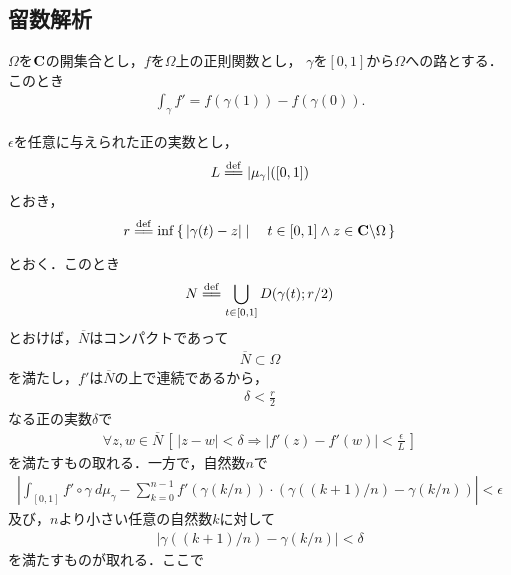 \subsection{留数解析}
	
	\begin{screen}
		\begin{thm}[線積分の微分積分学の基本定理]
			$\Omega$を$\mathbf{C}$の開集合とし，$f$を$\Omega$上の正則関数とし，
			$\gamma$を$[0,1]$から$\Omega$への路とする．このとき
			\begin{align}
				\int_{\gamma} f' = f(\gamma(1)) - f(\gamma(0)).
			\end{align}
		\end{thm}
	\end{screen}
	
	\begin{sketch}
		$\epsilon$を任意に与えられた正の実数とし，
		\begin{align}
			L \defeq |\mu_{\gamma}|([0,1])
		\end{align}
		とおき，
		\begin{align}
			r \defeq \inf{}{\Set{|\gamma(t) - z|}{t \in [0,1] \wedge z \in \C \backslash \Omega}}
		\end{align}
		とおく．このとき
		\begin{align}
			N \defeq \bigcup_{t \in [0,1]} \disc{\gamma(t)}{r/2}
		\end{align}
		とおけば，$\overline{N}$はコンパクトであって
		\begin{align}
			\overline{N} \subset \Omega
		\end{align}
		を満たし，$f'$は$\overline{N}$の上で連続であるから，
		\begin{align}
			\delta < \frac{r}{2}
		\end{align}
		なる正の実数$\delta$で
		\begin{align}
			\forall z,w \in \overline{N}\,
			\left[\, |z-w| < \delta \Longrightarrow |f'(z) - f'(w)| < \frac{\epsilon}{L}\, \right]
		\end{align}
		を満たすもの取れる．一方で，自然数$n$で
		\begin{align}
			\left|\int_{[0,1]} f' \circ \gamma\ d\mu_{\gamma}
			- \sum_{k=0}^{n-1} f'(\gamma(k/n)) \cdot \left(\gamma((k+1)/n) - \gamma(k/n)\right)\right|
			< \epsilon
		\end{align}
		及び，$n$より小さい任意の自然数$k$に対して
		\begin{align}
			|\gamma((k+1)/n) - \gamma(k/n)| < \delta
		\end{align}
		を満たすものが取れる．ここで

\end{sketch}
